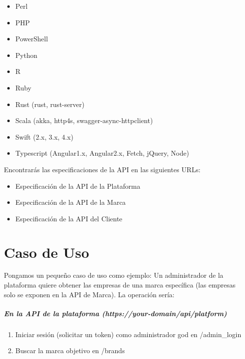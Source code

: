 \documentclass[letterpaper,10pt,spanish]{sphinxmanual}
\begin{document}
\begin{itemize}
\item {} 
Perl

\item {} 
PHP

\item {} 
PowerShell

\item {} 
Python

\item {} 
R

\item {} 
Ruby

\item {} 
Rust (rust, rust-server)

\item {} 
Scala (akka, http4s, swagger-async-httpclient)

\item {} 
Swift (2.x, 3.x, 4.x)

\item {} 
Typescript (Angular1.x, Angular2.x, Fetch, jQuery, Node)

\end{itemize}

Encontrarás las especificaciones de la API en las siguientes URLs:
\begin{itemize}
\item {} 
Especificación de la API de la Plataforma

\item {} 
Especificación de la API de la Marca

\item {} 
Especificación de la API del Cliente

\end{itemize}


\chapter{Caso de Uso}
\label{api_rest/use_case:use-case}\label{api_rest/use_case::doc}\label{api_rest/use_case:id1}
Pongamos un pequeño caso de uso como ejemplo: Un administrador de la plataforma quiere obtener las empresas de una marca específica (las empresas solo se exponen en la API de Marca). La operación sería:
\paragraph{En la API de la plataforma (https://your-domain/api/platform)}
\begin{enumerate}
\item {} 
Iniciar sesión (solicitar un token) como administrador god en /admin\_login

\item {} 
Buscar la marca objetivo en /brands

\end{enumerate}
\end{document}
